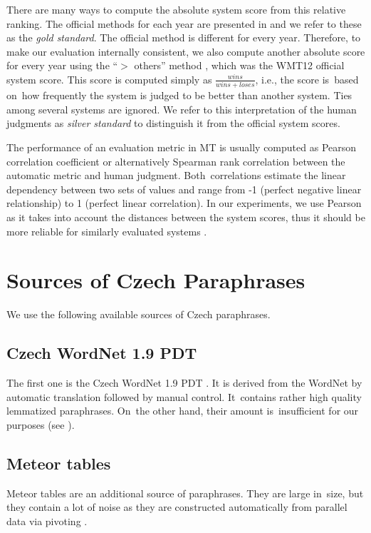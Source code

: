 There are many ways to compute the absolute system score from this relative
ranking. The official methods for each year are presented in  
and we refer to these as the \textit{gold standard}. The official method is
different for every year. Therefore, to make our evaluation internally 
consistent, we also compute another absolute score for every year using the 
“$ >$ others” method \cite{bojar-grains}, which was the WMT12 official system
score. This score is computed simply as $\frac{wins}{wins+loses} $, i.e., the 
score is~based on~how frequently the system is judged to be better than 
another system. Ties among several systems are ignored. We refer to this 
interpretation of the human judgments as \textit{silver standard} to distinguish
it from the official system scores.

The performance of an evaluation metric in MT is usually computed as Pearson 
correlation coefficient or alternatively Spearman rank correlation between the 
automatic metric and human judgment. Both~correlations estimate the linear 
dependency between two sets of values and range from -1 (perfect negative 
linear relationship) to 1 (perfect linear correlation). In our experiments, we use
Pearson as it takes into account the distances between the system scores, thus 
it should be more reliable for similarly evaluated systems 
\citep{machacek-bojar-2014-results}.

\section{Sources of Czech Paraphrases}
We use the following available sources of Czech paraphrases.

\subsection{Czech WordNet 1.9 PDT}
The first one is the Czech WordNet 1.9 PDT \cite{czech-wordnet}. It is derived from the WordNet
\cite{wordnet} by automatic translation followed by manual control. It~contains rather high quality 
lemmatized paraphrases. On~the other hand, their amount is~insufficient for our purposes (see 
). 

\subsection{Meteor tables} %
\label{meteori}
Meteor tables \cite{meteor} are an additional source of paraphrases. 
They are large in~size, but they contain a lot of noise as they are constructed automatically 
from parallel data via pivoting \cite{pivoting}. 

